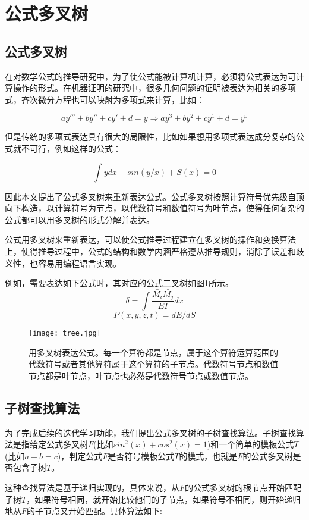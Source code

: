 \documentclass[runningheads]{llncs}
\begin{document}
\section{公式多叉树}
\subsection{公式多叉树}
在对数学公式的推导研究中，为了使公式能被计算机计算，必须将公式表达为可计算操作的形式。在机器证明的研究中，很多几何问题的证明被表达为相关的多项式\cite{ref_proc1}，齐次微分方程也可以映射为多项式来计算，比如：

$$ay'''+by''+cy'+d=y \Rightarrow ay^3+by^2+cy^1+d=y^0$$

但是传统的多项式表达具有很大的局限性，比如如果想用多项式表达成分复杂的公式就不可行，例如这样的公式：

$$\int{ydx}+sin(y/x)+S(x)=0$$

因此本文提出了公式多叉树来重新表达公式。公式多叉树按照计算符号优先级自顶向下构造，以计算符号为节点，以代数符号和数值符号为叶节点，使得任何复杂的公式都可以用多叉树的形式分解并表达。

公式用多叉树来重新表达，可以使公式推导过程建立在多叉树的操作和变换算法上，使得推导过程中，公式的结构和数学内涵严格遵从推导规则，消除了误差和歧义性，也容易用编程语言实现。

例如，需要表达如下公式时，其对应的公式二叉树如图1所示。
$$\delta = \int \frac{\bar{M_i}\bar{M_j}}{EI}dx $$
$$P(x,y,z,t)=dE/dS$$

\begin{figure}[H]
\centering
\texttt{[image: tree.jpg]}
\caption{用多叉树表达公式。每一个算符都是节点，属于这个算符运算范围的代数符号或者其他算符属于这个算符的子节点。代数符号节点和数值节点都是叶节点，叶节点也必然是代数符号节点或数值节点。}
\end{figure}

\subsection{子树查找算法}
为了完成后续的迭代学习功能，我们提出公式多叉树的子树查找算法。子树查找算法是指给定公式多叉树$F$(比如$sin^2(x)+cos^2(x)=1$)和一个简单的模板公式$T$(比如$a+b=c$)，判定公式$F$是否符号模板公式$T$的模式，也就是$F$的公式多叉树是否包含子树$T$。

这种查找算法是基于递归实现的，具体来说，从$F$的公式多叉树的根节点开始匹配子树$T$，如果符号相同，就开始比较他们的子节点，如果符号不相同，则开始递归地从$F$的子节点又开始匹配。具体算法如下:
\end{document}
